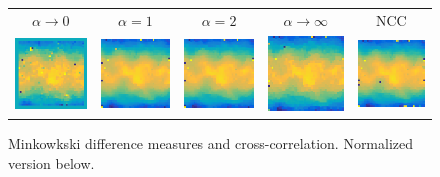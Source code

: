 \documentclass[10pt]{article}
\begin{document}
\begin{figure}[htp]
{\begin{tabular}{ccccc}
    $\alpha\rightarrow0$ & $\alpha=1$ & $\alpha=2$ & $\alpha\rightarrow\infty$ & NCC \\
    \includegraphics[width=.15\textwidth]{measureimages/U1n.eps} &
    \includegraphics[width=.15\textwidth]{measureimages/U2n.eps} &
    \includegraphics[width=.15\textwidth]{measureimages/U3n.eps} &
    \includegraphics[width=.15\textwidth]{measureimages/U4n.eps} &
    \includegraphics[width=.15\textwidth]{measureimages/U5n.eps} \\
  \end{tabular}}
  \caption{Minkowkski difference measures and cross-correlation. Normalized version below.}
\end{figure}

   
\end{document}
